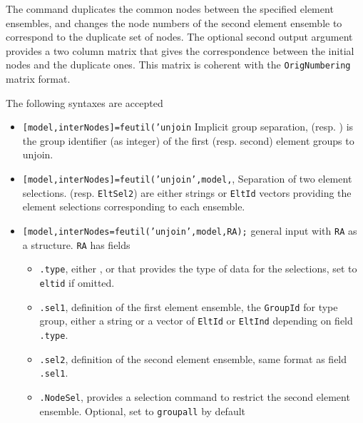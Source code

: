 The command duplicates the common nodes between the specified element ensembles, and changes the node numbers of the second element ensemble to correspond to the duplicate set of nodes. The optional second output argument provides a two column matrix that gives the correspondence between the initial nodes and the duplicate ones. This matrix is coherent with the {\tt OrigNumbering} matrix format.

The following syntaxes are accepted
\begin{itemize}
\item {\tt [model,interNodes]=feutil('unjoin}  Implicit group separation,  (resp. ) is the group identifier (as integer) of the first (resp. second) element groups to unjoin.
\item {\tt [model,interNodes]=feutil('unjoin',model,}, Separation of two element selections.  (resp. {\tt EltSel2}) are either  strings or {\tt EltId} vectors providing the element selections corresponding to each ensemble.
\item {\tt [model,interNodes=feutil('unjoin',model,RA);} general input with {\tt RA} as a structure. {\tt RA} has fields
\begin{itemize}
\item {\tt .type}, either ,  or  that provides the type of data for the selections, set to {\tt eltid} if omitted.
\item {\tt .sel1}, definition of the first element ensemble, the {\tt GroupId} for type group, either a  string or a vector of {\tt EltId} or {\tt EltInd} depending on field {\tt .type}.
\item {\tt .sel2},  definition of the second element ensemble, same format as field {\tt .sel1}.
\item {\tt .NodeSel}, provides a  selection command to restrict the second element ensemble. Optional, set to {\tt groupall} by default
\end{itemize}
\end{itemize}


